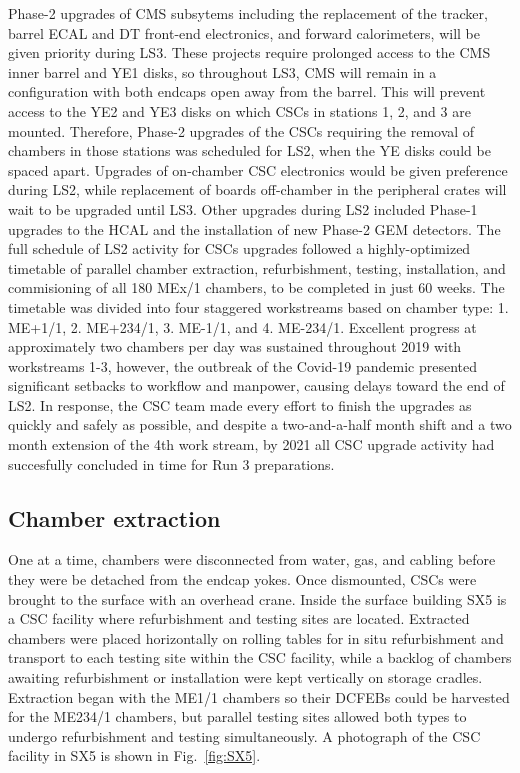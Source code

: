 

Phase-2 upgrades of CMS subsytems including the replacement of the tracker, barrel ECAL and DT front-end electronics, and forward calorimeters, will be given priority during LS3. These projects require prolonged access to the CMS inner barrel and YE1 disks, so throughout LS3, CMS will remain in a configuration with both endcaps open away from the barrel. This will prevent access to the YE2 and YE3 disks on which CSCs in stations 1, 2, and 3 are mounted. Therefore, Phase-2 upgrades of the CSCs requiring the removal of chambers in those stations was scheduled for LS2, when the YE disks could be spaced apart. Upgrades of on-chamber CSC electronics would be given preference during LS2, while replacement of boards off-chamber in the peripheral crates will wait to be upgraded until LS3. Other upgrades during LS2 included Phase-1 upgrades to the HCAL and the installation of new Phase-2 GEM detectors. The full schedule of LS2 activity for CSCs upgrades followed a highly-optimized timetable of parallel chamber extraction, refurbishment, testing, installation, and commisioning of all 180 MEx/1 chambers, to be completed in just 60 weeks. The timetable was divided into four staggered workstreams based on chamber type: 1. ME+1/1, 2. ME+234/1, 3. ME-1/1, and 4. ME-234/1. Excellent progress at approximately two chambers per day was sustained throughout 2019 with workstreams 1-3, however, the outbreak of the Covid-19 pandemic presented significant setbacks to workflow and manpower, causing delays toward the end of LS2. In response, the CSC team made every effort to finish the upgrades as quickly and safely as possible, and despite a two-and-a-half month shift and a two month extension of the 4th work stream, by 2021 all CSC upgrade activity had succesfully concluded in time for Run 3 preparations.

\subsection{Chamber extraction} \label{sec:ChamberExtraction}

One at a time, chambers were disconnected from water, gas, and cabling before they were be detached from the endcap yokes. Once dismounted, CSCs were brought to the surface with an overhead crane. Inside the surface building SX5 is a CSC facility where refurbishment and testing sites are located. Extracted chambers were placed horizontally on rolling tables for in situ refurbishment and transport to each testing site within the CSC facility, while a backlog of chambers awaiting refurbishment or installation were kept vertically on storage cradles. Extraction began with the ME1/1 chambers so their DCFEBs could be harvested for the ME234/1 chambers, but parallel testing sites allowed both types to undergo refurbishment and testing simultaneously. A photograph of the CSC facility in SX5 is shown in Fig.~\ref{fig:SX5}.

